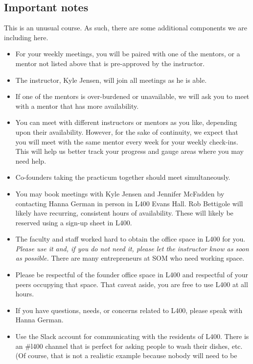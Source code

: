\subsection*{Important notes}

This is an unusual course. As such, there are some additional components
we are including here.

\begin{itemize}
	\item For your weekly meetings, you will be paired with one of the mentors, or a mentor not listed above
		that is pre-approved by the instructor.
	\item The instructor, Kyle Jensen, will join all meetings as he is able.
	\item If one of the mentors is over-burdened or unavailable, we will
		ask you to meet with a mentor that has more availability.
	\item You can meet with different instructors or mentors as
		you like, depending upon their availability. However, for the sake of continuity, we expect that you will meet with the same mentor every week for your weekly check-ins. This will help us better track your progress and gauge areas where you may need help.
			\item Co-founders taking the practicum together should meet simultaneously.
	\item You may book meetings with Kyle Jensen and Jennifer McFadden
		by contacting Hanna German in person in L400 Evans Hall. Rob
		Bettigole will likely have recurring, consistent hours of availability.
		These will likely be reserved using a sign-up sheet in L400.
	\item The faculty and staff worked hard to obtain the office space
		in L400 for you. \emph{Please use it and, if you do not need
		it, please let the instructor know as soon as possible.}
		There are many entrepreneurs at SOM who need working space.
	\item Please be respectful of the founder office space in L400 and
		respectful of your peers occupying that space. That caveat aside,
		you are free to use L400 at all hours.
	\item If you have questions, needs, or concerns
		related to L400, please speak with Hanna German.
	\item Use the Slack account for communicating with the residents of
		L400. There is an \#l400 channel that is perfect for asking people
		to wash their dishes, etc. (Of course, that is not a realistic
		example because nobody will need to be

\end{itemize}
